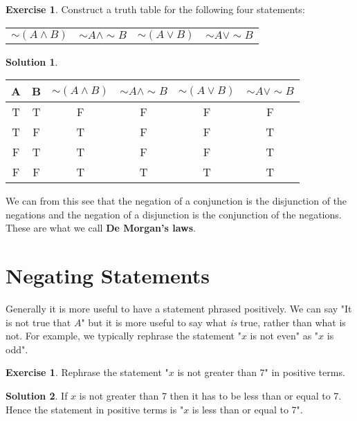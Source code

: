 \documentclass[a4paper, 11pt]{report}
\theoremstyle{plain}
\theoremstyle{definition}
\newtheorem{exrc}[thm]{Exercise}
\newtheorem*{sltn}{Solution}
\renewcommand{\neg}{{\sim}} %
\begin{document}
\begin{exrc}
  Construct a truth table for the following four statements:\\
  \begin{tabular}{cccc}
    $\neg(A\land B)$& $\neg A\land \neg B$ & $\neg(A\lor B)$ & $\neg A \lor \neg B$
  \end{tabular} 
\end{exrc}
\begin{sltn}
  \begin{table}[h!]
    \centering
    \begin{tabular}{cccccc}
    \hline
    A&  B&  $\neg(A\land B)$& $\neg A\land \neg B$ & $\neg(A\lor B)$ & $\neg A \lor \neg B$ \\
    \hline
   T&  T&  F&  F& F & F  \\
   T&  F&  T&  F& F & T \\
   F&  T&  T&  F& F & T \\
   F&  F&  T&  T& T & T \\
    \hline
    \end{tabular}
  \end{table}
\end{sltn}
  We can from this see that the negation of a conjunction is the disjunction of
  the negations and the negation of a disjunction is the conjunction of the
  negations. These are what we call \textbf{De Morgan's laws}.

  \section{Negating Statements}
  \label{sec:negating_statements}
  
  Generally it is more useful to have a statement phrased positively. We can
  say "It is not true that $A$" but it is more useful to say what \textit{is}
  true, rather than what is not. For example, we typically rephrase the
  statement "$x$ is not even" as "$x$ is odd".

  \begin{exrc}
    Rephrase the statement "$x$ is not greater than 7" in positive terms.
  \end{exrc}
  
  \begin{sltn}
    If $x$ is not greater than 7 then it has to be less than or equal to 7. Hence
    the statement in positive terms is "$x$ is less than or equal to 7".
  \end{sltn}
\end{document}
